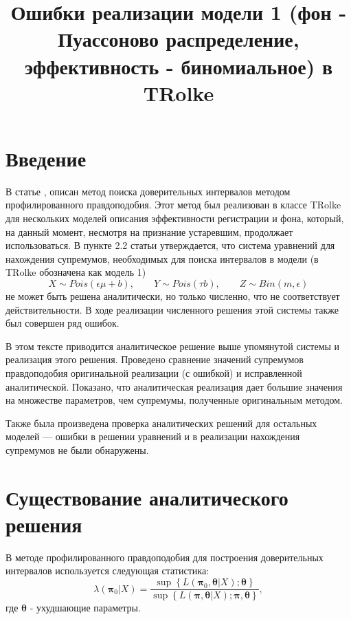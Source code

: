 \documentclass[14pt]{article}
\title{Ошибки реализации модели 1 (фон - Пуассоново распределение, эффективность - биномиальное) в TRolke}
\date{}
\begin{document}
\maketitle{}
\vspace{-5em} 

\section{Введение}
В статье \cite{Rolke_paper}, описан метод поиска доверительных интервалов методом профилированного правдоподобия.
 Этот метод был реализован в классе TRolke для нескольких моделей описания эффективности регистрации и фона, который, на данный момент, несмотря на признание устаревшим, продолжает использоваться.
 В пункте 2.2 статьи \cite{Rolke_paper} утверждается, что система уравнений для нахождения супремумов, необходимых для поиска интервалов в модели (в TRolke обозначена как модель 1)
$$X\sim Pois(\epsilon \mu +b),\qquad Y\sim Pois(\tau b),\qquad Z\sim Bin(m,\epsilon)$$ 
не может быть решена аналитически, но только численно, что не соответствует действительности.
В ходе реализации численного решения этой системы также был совершен ряд ошибок.

В этом тексте приводится аналитическое решение выше упомянутой системы и реализация этого решения. Проведено сравнение значений супремумов правдоподобия оригинальной реализации (с ошибкой) и исправленной аналитической.
Показано, что аналитическая реализация дает большие значения на множестве параметров, чем супремумы, полученные оригинальным методом.

Также была произведена проверка аналитических решений для остальных моделей --- ошибки в решении уравнений и в реализации нахождения супремумов не были обнаружены.

\section{Существование аналитического решения}

В методе профилированного правдоподобия для построения доверительных интервалов используется следующая статистика:
$$\lambda \left(\mathbf{\pi}_0 | X\right) = \frac{\sup\left\{ L \left(\mathbf{\pi}_0, \mathbf{\theta } | X\right); \mathbf{\theta } \right\} } {\sup\left\{ L \left(\mathbf{\pi}, \mathbf{\theta } | X\right); \mathbf{\pi}, \mathbf{\theta } \right\}} ,$$
где $\mathbf{\theta }$ - ухудшающие параметры.
\end{document}
